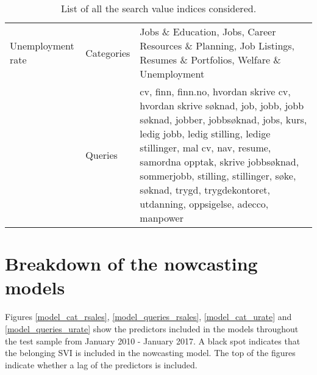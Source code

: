 \begin{table}[H]
\begin{tabularx}{\textwidth}{@{}llX@{}}
  		\midrule
  		Unemployment rate & Categories & Jobs \& Education, Jobs, Career Resources \& Planning, Job Listings, Resumes \& Portfolios, Welfare \& Unemployment \\
  		& Queries & cv, finn, finn.no, hvordan skrive cv, hvordan skrive søknad, job, jobb, jobb søknad, jobber, jobbsøknad, jobs, kurs, ledig jobb, ledig stilling, ledige stillinger, mal cv, nav, resume, samordna opptak, skrive jobbsøknad, sommerjobb, stilling, stillinger, søke, søknad, trygd, trygdekontoret, utdanning, oppsigelse, adecco, manpower \\
   		\bottomrule
	\end{tabularx}
	\caption{List of all the search value indices considered.}
	\label{tab:svi_list}
\end{table}
\newpage
\section{Breakdown of the nowcasting models}\label{model_breakdown}

Figures \ref{model_cat_rsales}, \ref{model_queries_rsales}, \ref{model_cat_urate} and \ref{model_queries_urate} show the predictors included in the models throughout the test sample from January 2010 - January 2017. A black spot indicates that the belonging SVI is included in the nowcasting model. The top of the figures indicate whether a lag of the predictors is included.

